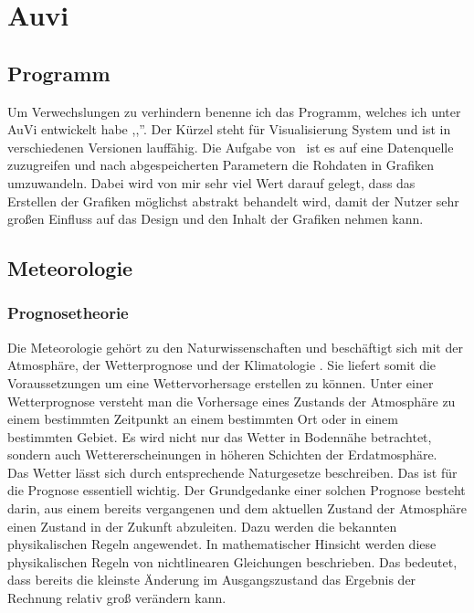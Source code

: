 \section{Auvi}

\subsection{Programm} %
Um Verwechslungen zu verhindern benenne ich das Programm,
welches ich unter AuVi entwickelt habe ,,\vs ''.
Der Kürzel steht für Visualisierung System und ist in verschiedenen Versionen lauffähig.
Die Aufgabe von \vs\ ist es auf eine Datenquelle zuzugreifen
und nach abgespeicherten Parametern die Rohdaten in Grafiken umzuwandeln.
Dabei wird von mir sehr viel Wert darauf gelegt,
dass das Erstellen der Grafiken möglichst abstrakt behandelt wird,
damit der Nutzer sehr großen Einfluss auf das Design und den Inhalt der Grafiken nehmen kann.

\subsection{Meteorologie} %

\subsubsection{Prognosetheorie} %
Die Meteorologie gehört zu den Naturwissenschaften und
beschäftigt sich mit der Atmosphäre, der Wetterprognose und der Klimatologie \cite{meteorologie}.
Sie liefert somit die Voraussetzungen um eine Wettervorhersage erstellen zu können.
Unter einer Wetterprognose versteht man die Vorhersage eines Zustands
der Atmosphäre zu einem bestimmten Zeitpunkt an einem bestimmten Ort
oder in einem bestimmten Gebiet.
Es wird nicht nur das Wetter in Bodennähe betrachtet,
sondern auch Wettererscheinungen in höheren Schichten der Erdatmosphäre.
\\
Das Wetter lässt sich durch entsprechende Naturgesetze beschreiben.
Das ist für die Prognose essentiell wichtig.
Der Grundgedanke einer solchen Prognose besteht darin,
aus einem bereits vergangenen und dem aktuellen Zustand
der Atmosphäre einen Zustand in der Zukunft abzuleiten.
Dazu werden die bekannten physikalischen Regeln angewendet.
In mathematischer Hinsicht werden diese physikalischen Regeln von
nichtlinearen Gleichungen beschrieben.
Das bedeutet, dass bereits die kleinste Änderung im Ausgangszustand
das Ergebnis der Rechnung relativ groß verändern kann. %


